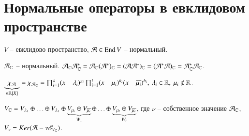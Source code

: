 \documentclass[main]{subfiles}
\begin{document}
\chapter{Нормальные операторы в евклидовом пространстве}

$V$ -- евклидово пространство, $\mathcal{A} \in \operatorname{End} V$ -- нормальный.

$\mathcal{A}_{\mathbb{C}}$ -- нормальный. $\mathcal{A}_{\mathbb{C}}\mathcal{A}_{\mathbb{C}}^* = \mathcal{A}_{\mathbb{C}}(\mathcal{A}^*)_{\mathbb{C}} = (\mathcal{A}\mathcal{A}^*)_{\mathbb{C}} = (\mathcal{A}^*\mathcal{A})_{\mathbb{C}} = \mathcal{A}_{\mathbb{C}}^*\mathcal{A}_{\mathbb{C}}$.

$\underbrace{\chi_{\mathcal{A}}}_{\in \mathbb{R}[X]} = \chi_{\mathcal{A}_{\mathbb{C}}} = \prod_{i=1}^s(x - \lambda_i)^{g_i} \prod_{i=1}^t(x - \mu_i)^{h_i} (x - \overline{\mu_i})^{h_i}, \ \lambda_i \in \mathbb{R}, \ \mu_i \not\in \mathbb{R}$.

$V_{\mathbb{C}} = V_{\lambda_1}\oplus\ldots\oplus V_{\lambda_1}\oplus \underbrace{V_{\mu_i}\oplus V_{\overline{\mu_i}}}_{W_1} \oplus \ldots \oplus\underbrace{V_{\mu_t} \oplus V_{\overline{\mu_t}}}_{W_t}$, где 
$\nu$ -- собственное значение $\mathcal{A}_{\mathbb{C}}$, $V_{\nu} = Ker(\mathcal{A} - \nu \mathscr{E}_{V_{\mathbb{C}}})$.
\end{document}
